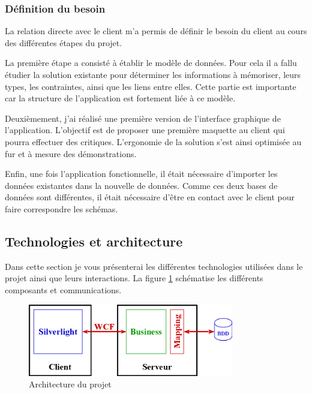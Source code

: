 \subsubsection{Définition du besoin}

La relation directe avec le client m'a permis de définir le besoin du client au cours des différentes étapes du projet.

La première étape a consisté à établir le modèle de données.
Pour cela il a fallu étudier la solution existante pour déterminer les informations à mémoriser, leurs types, les contraintes, ainsi que les liens entre elles.
Cette partie est importante car la structure de l'application est fortement liée à ce modèle.

Deuxièmement, j'ai réalisé une première version de l'interface graphique de l'application.
L'objectif est de proposer une première maquette au client qui pourra effectuer des critiques.
L'ergonomie de la solution s'est ainsi optimisée au fur et à mesure des démonstrations.

Enfin, une fois l'application fonctionnelle, il était nécessaire d'importer les données existantes dans la nouvelle de données.
Comme ces deux bases de données sont différentes, il était nécessaire d'être en contact avec le client pour faire correspondre les schémas.


\subsection{Technologies et architecture}

Dans cette section je vous présenterai les différentes technologies utilisées dans le projet ainsi que leurs interactions.
La figure \ref{architecture} schématise les différents composants et communications.
\begin{figure}[!h]
	\center
	\includegraphics[width=0.8\textwidth]{img/architecture.png}
	\caption{Architecture du projet}
	\label{architecture}
\end{figure}
~~\\

